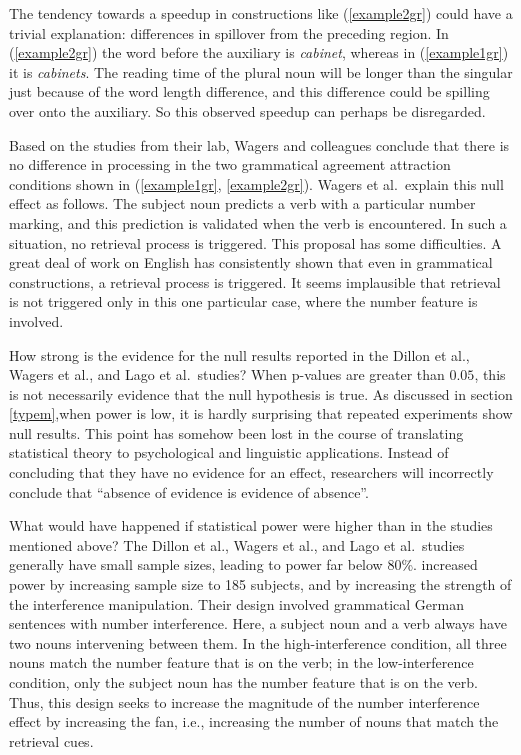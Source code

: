 \documentclass{cambridge7A}\usepackage[]{graphicx}\usepackage[]{color}
\begin{document}
The tendency towards a speedup in constructions like (\ref{example2gr}) could have a trivial explanation: differences in spillover from the preceding region. In (\ref{example2gr}) the word before the auxiliary is \textit{cabinet}, whereas in (\ref{example1gr}) it is  \textit{cabinets}. The reading time of the plural noun will be longer than the singular just because of the word length difference, and this difference could be spilling over onto the auxiliary. So this observed speedup can perhaps be disregarded. 

Based on the studies from their lab, Wagers and colleagues conclude that there is no difference in processing in the two grammatical agreement attraction conditions  shown in  (\ref{example1gr}, \ref{example2gr}). Wagers et al.\ explain this null effect as follows. The subject noun predicts a verb with a particular number marking, and this prediction is validated when the verb is encountered. In such a situation, no retrieval process is triggered.  This proposal has some difficulties. A great deal of work on English \citep{Gibson2000,grodner,Bartek2011} has consistently shown that even in grammatical constructions, a retrieval process is triggered. It seems implausible that retrieval is not triggered only in this one particular case, where the number feature is involved.

How strong is the evidence for the null results reported in the Dillon et al., Wagers et al., and Lago et al.\ studies? When  p-values are greater than $0.05$, this is not necessarily evidence that the null hypothesis is true. As  discussed in section \ref{typem},when  power is low, it is hardly surprising that repeated experiments show null results. This point has somehow been lost in the course of translating statistical theory to  psychological and linguistic applications. Instead of concluding that they have no evidence for an effect, researchers will incorrectly conclude that ``absence of evidence is evidence of absence''. 

What would have happened if statistical power were higher than in the studies mentioned above? The Dillon et al., Wagers et al., and Lago et al.\  studies generally have small sample sizes, leading to power far below 80\%. 
 \cite{NicenboimEtAlCogSci2018} increased power by increasing sample size to 185 subjects, and by increasing the strength of the interference manipulation. Their design involved grammatical German sentences with number interference. Here, a subject noun and a verb always have two nouns intervening between them. In the high-interference condition, all three nouns match the number  feature that is on the verb; in the low-interference condition, only the subject noun has the number feature that is on the verb. Thus, this design seeks to increase the magnitude of the number interference effect by increasing the  fan, i.e., increasing the number of nouns that match the retrieval cues.
\end{document}
